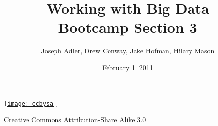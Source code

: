 \documentclass[xcolor=dvipsnames, 9pt]{beamer}
\title{Working with Big Data\\Bootcamp Section 3}
\author{Joseph Adler, Drew Conway, Jake Hofman, Hilary Mason}
\date{February 1, 2011}
\begin{document}
 

\begin{frame}[plain]
  \titlepage 
  
  \tiny
  \href{http://creativecommons.org/licenses/by-sa/3.0/us/}{\texttt{[image: ccbysa]}}

  Creative Commons Attribution-Share Alike 3.0
\end{frame}
\end{document}

